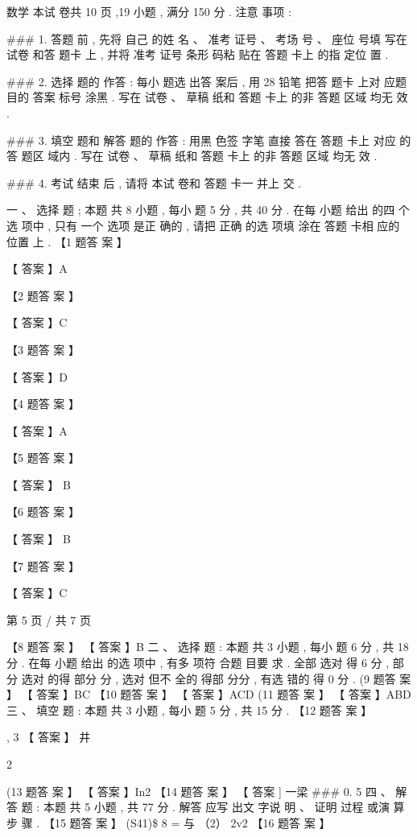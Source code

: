\documentclass[12pt,a4paper]{ctexart}
\begin{document}
{数学
本试 卷共 10 页 ,19 小题 , 满分 150 分 .
注意 事项 :

\#\#\# 1. 答题 前 , 先将 自己 的姓 名 、 准考 证号 、 考场 号 、 座位 号填 写在 试卷 和答 题卡 上 , 并将 准考 证号 条形 码粘 贴在 答题 卡上 的指 定位 置 .

\#\#\# 2. 选择 题的 作答 : 每小 题选 出答 案后 , 用 28 铅笔 把答 题卡 上对 应题 目的 答案 标号 涂黑 . 写在 试卷 、 草稿 纸和 答题 卡上 的非 答题 区域 均无 效 .

\#\#\# 3. 填空 题和 解答 题的 作答 : 用黑 色签 字笔 直接 答在 答题 卡上 对应 的答 题区 域内 . 写在 试卷 、 草稿 纸和 答题 卡上 的非 答题 区域 均无 效 .

\#\#\# 4. 考试 结束 后 , 请将 本试 卷和 答题 卡一 并上 交 .

一 、 选择 题 ; 本题 共 8 小题 , 每小 题 5 分 , 共 40 分 . 在每 小题 给出 的四 个选 项中 , 只有
一个 选项 是正 确的 , 请把 正确 的选 项填 涂在 答题 卡相 应的 位置 上 .
【1 题答 案 】

【 答案 】A

【2 题答 案 】

【 答案 】C

【3 题答 案 】

【 答案 】D

【4 题答 案 】

【 答案 】A

【5 题答 案 】

【 答案 】 B

【6 题答 案 】

【 答案 】 B

【7 题答 案 】

【 答案 】C

第 5 页 / 共 7 页



【8 题答 案 】
【 答案 】B
二 、 选择 题 : 本题 共 3 小题 , 每小 题 6 分 , 共 18 分 . 在每 小题 给出 的选 项中 , 有多 项符 合题 目要 求 . 全部 选对 得 6 分 , 部分 选对 的得 部分 分 , 选对 但不 全的 得部 分分 , 有选 错的 得 0
分 .
(9 题答 案 】
【 答案 】BC
【10 题答 案 】
【 答案 】ACD
(11 题答 案 】
【 答案 】ABD
三 、 填空 题 : 本题 共 3 小题 , 每小 题 5 分 , 共 15 分 .
【12 题答 案 】

, 3
【 答案 】 井

2

(13 题答 案 】
【 答案 】In2
【14 题答 案 】
【 答案 ] 一梁 
\#\#\# 0. 5
四 、 解答 题 : 本题 共 5 小题 , 共 77 分 . 解答 应写 出文 字说 明 、 证明 过程 或演 算步 骤 .
【15 题答 案 】
(S41\right)\$ 8 = 与
（2） 2v2
【16 题答 案 】

}
\end{document}
